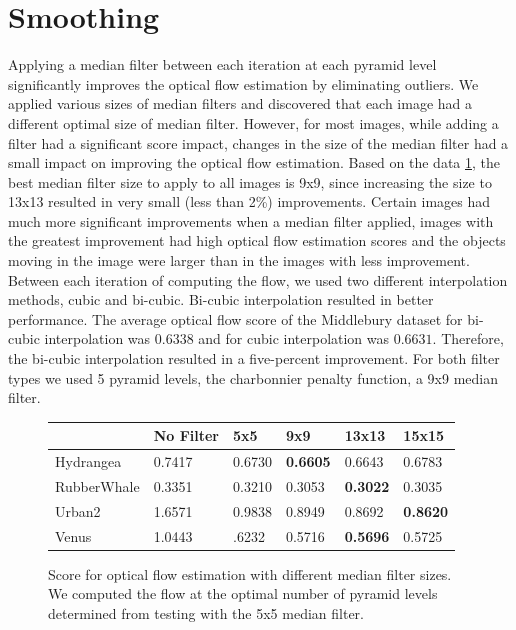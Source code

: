 \documentclass[10pt,twocolumn,letterpaper]{article}
\begin{document}
\section{Smoothing}
Applying a median filter between each iteration at each pyramid level significantly improves the optical flow estimation by eliminating outliers. We applied various sizes of median filters and discovered that each image had a different optimal size of median filter. However, for most images, while adding a filter had a significant score impact, changes in the size of the median filter had a small impact on improving the optical flow estimation.  Based on the data \ref{fig:medFiltTable}, the best median filter size to apply to all images is 9x9, since increasing the size to 13x13 resulted in very small (less than 2\%) improvements. Certain images had much more significant improvements when a median filter applied, images with the greatest improvement had high optical flow estimation scores and the objects moving in the image were larger than in the images with less improvement.
Between each iteration of computing the flow, we used two different interpolation methods, cubic and bi-cubic. Bi-cubic interpolation resulted in better performance. The average optical flow score of the Middlebury dataset for bi-cubic interpolation was $0.6338$ and for cubic interpolation was $0.6631$. Therefore, the bi-cubic interpolation resulted in a five-percent improvement. For both filter types we used 5 pyramid levels, the charbonnier penalty function, a 9x9 median filter.
\begin{figure}
\begin{tabularx}{1.0\textwidth} {|X |X |X |X |X |X|}
\hline
 & No Filter & 5x5 & 9x9 & 13x13 & 15x15 \\
\hline 
Hydrangea & 0.7417 & 0.6730 & \bf{0.6605} & 0.6643 & 0.6783 \\
\hline 
RubberWhale & 0.3351 & 0.3210 & 0.3053 & \bf{0.3022} &  0.3035\\
\hline 
Urban2 &  1.6571 & 0.9838 & 0.8949 & 0.8692 & \bf{0.8620}\\
\hline 
Venus &  1.0443 & .6232 & 0.5716 & \bf{0.5696} &  0.5725 \\
\hline
\end{tabularx}
\caption{Score for optical flow estimation with different median filter sizes. We computed the flow at the optimal number of pyramid levels determined from testing with the 5x5 median filter.}
\label{fig:medFiltTable}
\end{figure}
\end{document}
